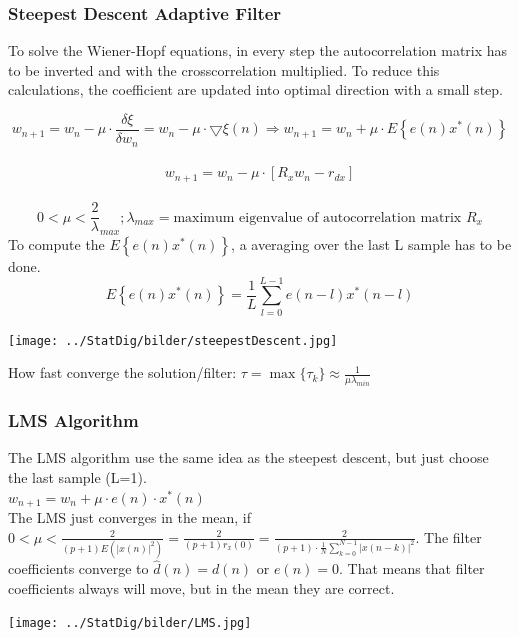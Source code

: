 \subsubsection{Steepest Descent Adaptive Filter }
To solve the Wiener-Hopf equations, in every step the autocorrelation matrix has to be inverted and with the crosscorrelation multiplied. 
To reduce this calculations, the coefficient are updated into optimal direction with a small step.
\begin{minipage}{13cm}
$$w_{n+1}=w_n-\mu \cdot  \dfrac{\delta \xi}{\delta w_n} =w_n-\mu \cdot \bigtriangledown\xi(n) \Rightarrow \boxed{ w_{n+1}= w_n+\mu \cdot E\left\lbrace e(n)x^*(n)\right\rbrace}$$ \\
																											$$ \boxed{	w_{n+1}= w_n - \mu \cdot [R_x w_n - r_{dx} ]   }$$ \\
$$ 0<\mu< \frac 2 \lambda_{max}; \lambda_{max} = \text{maximum eigenvalue of autocorrelation matrix } R_x$$
To compute the $E\left\lbrace e(n)x^*(n)\right\rbrace$, a averaging over the last L sample has to be done.  
$$E\left\lbrace e(n)x^*(n)\right\rbrace= \frac{1}{L}\sum\limits_{l=0}^{L-1}e(n-l)x^*(n-l)$$
\end{minipage}
\begin{minipage}{6cm}
        \texttt{[image: ../StatDig/bilder/steepestDescent.jpg]}
\end{minipage}

 How fast converge the solution/filter: $\displaystyle \tau=\max\{\tau_k\}\approx\frac{1}{\mu \lambda_{min}} $


\clearpage
\subsubsection{LMS Algorithm }
\begin{minipage}{14cm}

  The LMS algorithm use the same idea as the steepest descent, but just choose the last sample (L=1).\\
  $\boxed{ w_{n+1}=w_n+\mu \cdot e(n) \cdot x^*(n) }$\\
  
  The LMS just converges in the mean, if $\displaystyle 0<\mu< \frac{2}{(p+1)E\left(|x(n)|^2\right)}=\frac{2}{(p+1)r_x(0)}=\frac{2}{(p+1) \cdot \frac{1}{N} \sum_{k=0}^{N-1}|x(n-k)|^2}$.
  The filter coefficients converge to $\hat d(n) = d(n)$ or $e(n) = 0$. 
  That means that filter coefficients always will move, but in the mean they are correct.
\end{minipage}
\begin{minipage}{5cm}
  \texttt{[image: ../StatDig/bilder/LMS.jpg]}
\end{minipage}

